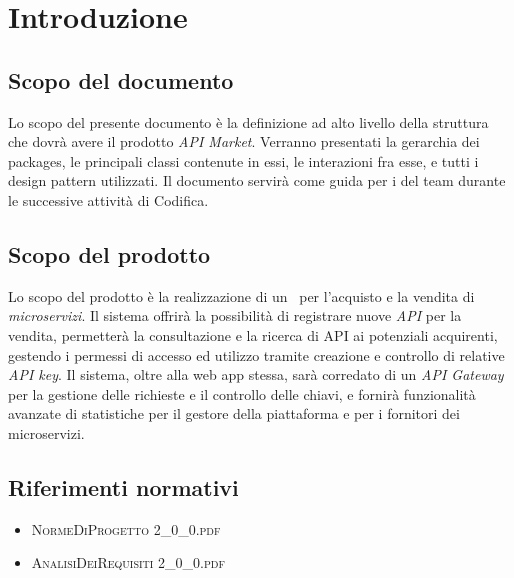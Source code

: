 \newpage
\section{Introduzione}

\subsection{Scopo del documento}
Lo scopo del presente documento è la definizione ad alto livello della struttura che dovrà avere il prodotto \textit{API Market}. Verranno presentati la gerarchia dei packages, le principali classi contenute in essi, le interazioni fra esse, e tutti i design pattern utilizzati. Il documento servirà come guida per i \textit{\Progrs} del team \textit{\gruppo} durante le successive attività di Codifica.

\subsection{Scopo del prodotto}
Lo scopo del prodotto è la realizzazione di un \progetto\ per l'acquisto e la vendita di \textit{microservizi}. Il sistema offrirà la possibilità di registrare nuove \textit{API} per la vendita, permetterà la consultazione e la ricerca di API ai potenziali acquirenti, gestendo i permessi di accesso ed utilizzo tramite creazione e controllo di relative \textit{API key}. Il sistema, oltre alla web app stessa, sarà corredato di un \textit{API Gateway} per la gestione delle richieste e il controllo delle chiavi, e fornirà funzionalità avanzate di statistiche per il gestore della piattaforma e per i fornitori dei microservizi.

\subsection{Riferimenti normativi}
\begin{itemize}
	\item \textsc{NormeDiProgetto 2\_0\_0.pdf}
	\item \textsc{AnalisiDeiRequisiti 2\_0\_0.pdf}
\end{itemize}

